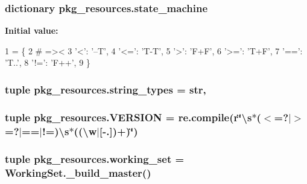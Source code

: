 \subsubsection[{state\+\_\+machine}]{\setlength{\rightskip}{0pt plus 5cm}dictionary pkg\+\_\+resources.\+state\+\_\+machine}\label{namespacepkg__resources_afec689ab0e66f096a179ffb991c68dcf}
{\bfseries Initial value\+:}
\begin{DoxyCode}
1 = \{
2     \textcolor{comment}{#       =><}
3     \textcolor{stringliteral}{'<'}: \textcolor{stringliteral}{'--T'},
4     \textcolor{stringliteral}{'<='}: \textcolor{stringliteral}{'T-T'},
5     \textcolor{stringliteral}{'>'}: \textcolor{stringliteral}{'F+F'},
6     \textcolor{stringliteral}{'>='}: \textcolor{stringliteral}{'T+F'},
7     \textcolor{stringliteral}{'=='}: \textcolor{stringliteral}{'T..'},
8     \textcolor{stringliteral}{'!='}: \textcolor{stringliteral}{'F++'},
9 \}
\end{DoxyCode}
\hypertarget{namespacepkg__resources_a27c827d64393f703088abdd389e918fc}{}
\subsubsection[{string\+\_\+types}]{\setlength{\rightskip}{0pt plus 5cm}tuple pkg\+\_\+resources.\+string\+\_\+types = str,}\label{namespacepkg__resources_a27c827d64393f703088abdd389e918fc}
\hypertarget{namespacepkg__resources_a74c55e2ef7e84f92141094b05d526991}{}
\subsubsection[{V\+E\+R\+S\+I\+O\+N}]{\setlength{\rightskip}{0pt plus 5cm}tuple pkg\+\_\+resources.\+V\+E\+R\+S\+I\+O\+N = re.\+compile({\bf r}\char`\"{}\textbackslash{}s$\ast$($<$=?$\vert$$>$=?$\vert$==$\vert$!=)\textbackslash{}{\bf s}$\ast$((\textbackslash{}w$\vert$\mbox{[}-\/.\mbox{]})+)\char`\"{})}\label{namespacepkg__resources_a74c55e2ef7e84f92141094b05d526991}
\hypertarget{namespacepkg__resources_a6137cc4c4f6d3a3857ad3e7d1b57f070}{}
\subsubsection[{working\+\_\+set}]{\setlength{\rightskip}{0pt plus 5cm}tuple pkg\+\_\+resources.\+working\+\_\+set = Working\+Set.\+\_\+build\+\_\+master()}\label{namespacepkg__resources_a6137cc4c4f6d3a3857ad3e7d1b57f070}
\hypertarget{namespacepkg__resources_a8cba25e3f73d53602d7f99bdba45d768}{}
